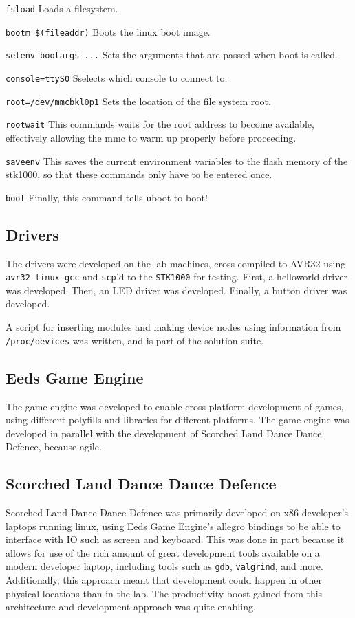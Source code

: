 \texttt{fsload} 
Loads a filesystem.

\texttt{bootm \$(fileaddr)} 
Boots the linux boot image.

\texttt{setenv bootargs ...} 
Sets the arguments that are passed when boot is called.

\texttt{console=ttyS0} 
Sselects which console to connect to.

\texttt{root=/dev/mmcbkl0p1} 
Sets the location of the file system root.

\texttt{rootwait} 
This commands waits for the root address to become available, effectively allowing the mmc to warm up properly before proceeding.

\texttt{saveenv} 
This saves the current environment variables to the flash memory of the stk1000, so that these commands only have to be entered once.

\texttt{boot} 
Finally, this command tells uboot to boot!



\subsection{Drivers}

The drivers were developed on the lab machines, cross-compiled to AVR32 using \texttt{avr32-linux-gcc} and \texttt{scp}'d to the \texttt{STK1000} for testing.
First, a helloworld-driver was developed.
Then, an LED driver was developed.
Finally, a button driver was developed.

A script for inserting modules and making device nodes using information from \texttt{/proc/devices} was written, and is part of the solution suite.


\subsection{Eeds Game Engine}

The game engine was developed to enable cross-platform development of games, using different polyfills and libraries for different platforms. The game engine was developed in parallel with the development of Scorched Land Dance Dance Defence, because agile.

\subsection{Scorched Land Dance Dance Defence}

Scorched Land Dance Dance Defence was primarily developed on x86 developer's laptops running linux, using Eeds Game Engine's allegro bindings to be able to interface with IO such as screen and keyboard.
This was done in part because it allows for use of the rich amount of great development tools available on a modern developer laptop, including tools such as \texttt{gdb}, \texttt{valgrind}, and more.
Additionally, this approach meant that development could happen in other physical locations than in the lab.
The productivity boost gained from this architecture and development approach was quite enabling.

